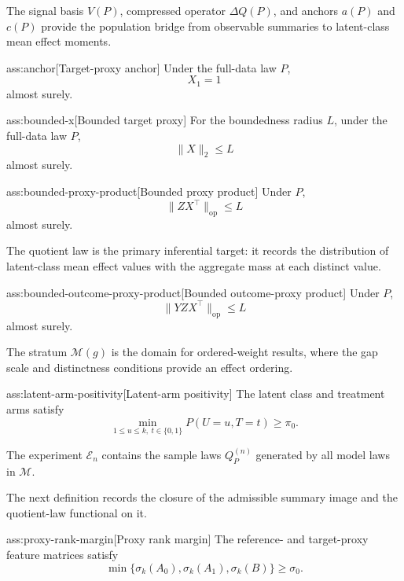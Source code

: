 \documentclass[11pt]{article}
\begin{document}
The signal basis \(V(P)\), compressed operator \(\Delta Q(P)\), and anchors \(a(P)\) and \(c(P)\) provide the population bridge from observable summaries to latent-class mean effect moments.

\begin{assumptionv}{ass:anchor}[Target-proxy anchor]
Under the full-data law \(P\),
\[
X_1=1
\]
almost surely.
\end{assumptionv}

\begin{assumptionv}{ass:bounded-x}[Bounded target proxy]
For the boundedness radius \(L\), under the full-data law \(P\),
\[
\lVert X\rVert_2\le L
\]
almost surely.
\end{assumptionv}

\begin{assumptionv}{ass:bounded-proxy-product}[Bounded proxy product]
Under \(P\),
\[
\lVert ZX^\top\rVert_{\mathrm{op}}\le L
\]
almost surely.
\end{assumptionv}

The quotient law is the primary inferential target: it records the distribution of latent-class mean effect values with the aggregate mass at each distinct value.

\begin{assumptionv}{ass:bounded-outcome-proxy-product}[Bounded outcome-proxy product]
Under \(P\),
\[
\lVert YZX^\top\rVert_{\mathrm{op}}\le L
\]
almost surely.
\end{assumptionv}

The stratum \(\mathcal M(g)\) is the domain for ordered-weight results, where the gap scale and distinctness conditions provide an effect ordering.

\begin{assumptionv}{ass:latent-arm-positivity}[Latent-arm positivity]
The latent class and treatment arms satisfy
\[
\min_{1\le u\le k,\ t\in\{0,1\}} P(U=u,T=t)\ge \pi_0 .
\]
\end{assumptionv}

The experiment \(\mathcal E_n\) contains the sample laws \(Q_P^{(n)}\) generated by all model laws in \(\mathcal M\).

The next definition records the closure of the admissible summary image and the quotient-law functional on it.

\begin{assumptionv}{ass:proxy-rank-margin}[Proxy rank margin]
The reference- and target-proxy feature matrices satisfy
\[
\min\{\sigma_k(A_0),\sigma_k(A_1),\sigma_k(B)\}\ge \sigma_0 .
\]
\end{assumptionv}
\end{document}
